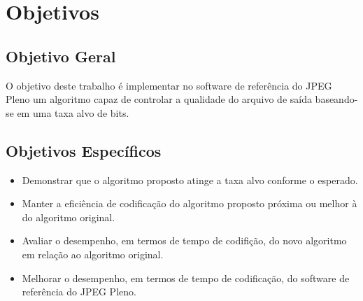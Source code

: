 \section{Objetivos}
    \subsection{Objetivo Geral}
        O objetivo deste trabalho é implementar no software de referência do JPEG Pleno um algoritmo capaz de controlar a qualidade do arquivo de
        saída baseando-se em uma taxa alvo de bits.

    \subsection{Objetivos Específicos}
        \begin{itemize}
            \item Demonstrar que o algoritmo proposto atinge a taxa alvo conforme o esperado.
            \item Manter a eficiência de codificação do algoritmo proposto próxima ou melhor à do algoritmo original.
            \item Avaliar o desempenho, em termos de tempo de codifição, do novo algoritmo em relação ao algoritmo original.
            \item Melhorar o desempenho, em termos de tempo de codificação, do software de referência do JPEG Pleno.
        \end{itemize}
